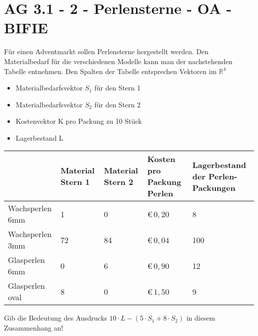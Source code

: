 \section{AG 3.1 - 2 - Perlensterne - OA - BIFIE}

\begin{beispiel}[AG 3.1]{1} %
Für einen Adventmarkt sollen Perlensterne hergestellt werden. Den Materialbedarf für die verschiedenen Modelle kann man der nachstehenden Tabelle entnehmen.
Den Spalten der Tabelle entsprechen Vektoren im $\mathbb{R}^{4}$
\begin{itemize}
	\item Materialbedarfsvektor $S_{1}$ für den Stern 1
	\item Materialbedarfsvektor $S_{2}$ für den Stern 2
	\item Kostenvektor K pro Packung zu 10 Stück
	\item Lagerbestand L
\end{itemize}
\begin{longtable}{l|C{2,5cm}|C{2,5cm}|C{3cm}|C{3cm}|}
&Material Stern 1&Material Stern 2&Kosten pro Packung Perlen & Lagerbestand der Perlen-Packungen\\ \hline
Wachsperlen 6mm & 1 & 0 & \euro\,$0,20$ & 8 \\ \hline
Wachsperlen 3mm & 72 & 84 & \euro\,$0,04$ & 100 \\ \hline
Glasperlen 6mm & 0 & 6 & \euro\,$0,90$ & 12 \\ \hline
Glasperlen oval & 8 & 0 & \euro\,$1,50$ & 9 \\ \hline
\end{longtable}

Gib die Bedeutung des Ausdrucks $10\cdot L-(5\cdot S_{1}+8\cdot S_{2})$ in diesem Zusammenhang an!

\end{beispiel}